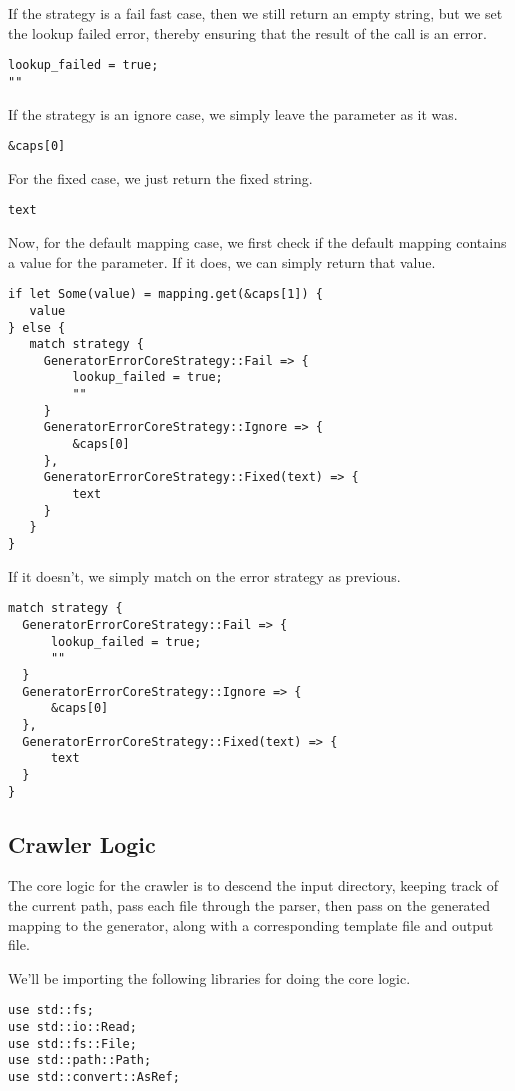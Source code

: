 \documentclass[11pt]{article}
\begin{document}
If the strategy is a fail fast case, then we still return an empty string, but we set the lookup failed
error, thereby ensuring that the result of the call is an error.
\begin{verbatim}
lookup_failed = true;
""
\end{verbatim}

If the strategy is an ignore case, we simply leave the parameter as it was.  
\begin{verbatim}
&caps[0]
\end{verbatim}

For the fixed case, we just return the fixed string.
\begin{verbatim}
text
\end{verbatim}


Now, for the default mapping case, we first check if the default mapping contains a value for the 
parameter. If it does, we can simply return that value.
\begin{verbatim}
if let Some(value) = mapping.get(&caps[1]) {
   value
} else {
   match strategy {
     GeneratorErrorCoreStrategy::Fail => {
         lookup_failed = true;
         ""
     }
     GeneratorErrorCoreStrategy::Ignore => {
         &caps[0]
     },
     GeneratorErrorCoreStrategy::Fixed(text) => {
         text
     }
   }  
}
\end{verbatim}


If it doesn't, we simply match on the error strategy as previous.
\begin{verbatim}
match strategy {
  GeneratorErrorCoreStrategy::Fail => {
      lookup_failed = true;
      ""
  }
  GeneratorErrorCoreStrategy::Ignore => {
      &caps[0]
  },
  GeneratorErrorCoreStrategy::Fixed(text) => {
      text
  }
}
\end{verbatim}

\subsection{Crawler Logic}
\label{sec:org5590ecf}
The core logic for the crawler is to descend the input directory, keeping track of the current path, pass each file through the parser, then pass on the generated mapping to the generator, along with a corresponding template file and output file.

We'll be importing the following libraries for doing the core logic.
\begin{verbatim}
use std::fs;
use std::io::Read;
use std::fs::File;
use std::path::Path;
use std::convert::AsRef;
\end{verbatim}
\end{document}
